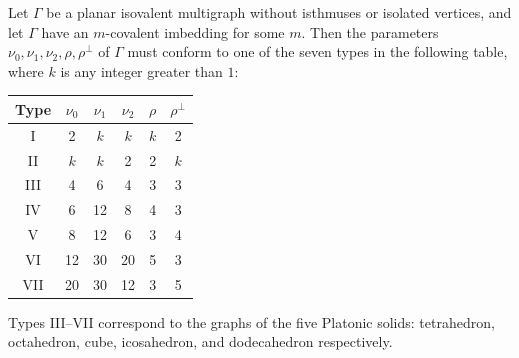 Let $\Gamma$ be a planar isovalent multigraph without isthmuses or isolated vertices, and let $\Gamma$ have an $m$-covalent imbedding for some $m$. Then the parameters $\nu_0, \nu_1, \nu_2, \rho, \rho^{\perp}$ of $\Gamma$ must conform to one of the seven types in the following table, where $k$ is any integer greater than $1$:

\begin{center}
\begin{tabular}{|c|c|c|c|c|c|}
\hline
Type & $\nu_0$ & $\nu_1$ & $\nu_2$ & $\rho$ & $\rho^{\perp}$ \\
\hline
I   & 2  & $k$  & $k$  & $k$ & 2 \\
II  & $k$  & $k$  & 2  & 2 & $k$ \\
III & 4  & 6  & 4  & 3 & 3 \\
IV  & 6  & 12 & 8  & 4 & 3 \\
V   & 8  & 12 & 6  & 3 & 4 \\
VI  & 12 & 30 & 20 & 5 & 3 \\
VII & 20 & 30 & 12 & 3 & 5 \\
\hline
\end{tabular}
\end{center}
Types III--VII correspond to the graphs of the five Platonic solids: tetrahedron, octahedron, cube, icosahedron, and dodecahedron respectively.
